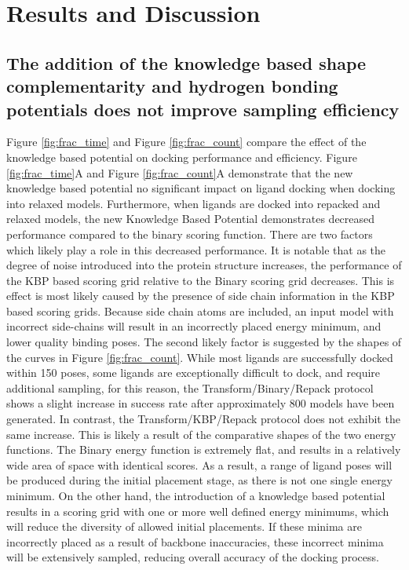 \section{Results and Discussion}

\subsection{The addition of the knowledge based shape complementarity and hydrogen bonding potentials does not improve sampling efficiency}

Figure \ref{fig:frac_time} and Figure \ref{fig:frac_count} compare the effect of the knowledge based potential on docking performance and efficiency.
Figure \ref{fig:frac_time}A and Figure \ref{fig:frac_count}A demonstrate that the new knowledge based potential no significant impact on ligand docking when docking into relaxed models.
Furthermore, when ligands are docked into repacked and relaxed models, the new Knowledge Based Potential demonstrates decreased performance compared to the binary scoring function. 
There are two factors which likely play a role in this decreased performance.
It is notable that as the degree of noise introduced into the protein structure increases, the performance of the \ac{KBP} based scoring grid relative to the Binary scoring grid decreases.
This is effect is most likely caused by the presence of side chain information in the \ac{KBP} based scoring grids.
Because side chain atoms are included, an input model with incorrect side-chains will result in an incorrectly placed energy minimum, and lower quality binding poses. 
The second likely factor is suggested by the shapes of the curves in Figure \ref{fig:frac_count}.
While most ligands are successfully docked within 150 poses, some ligands are exceptionally difficult to dock, and require additional sampling, for this reason, the Transform/Binary/Repack protocol shows a slight increase in success rate after approximately 800 models have been generated.
In contrast, the Transform/\ac{KBP}/Repack protocol does not exhibit the same increase.
This is likely a result of the comparative shapes of the two energy functions.
The Binary energy function is extremely flat, and results in a relatively wide area of space with identical scores.
As a result, a range of ligand poses will be produced during the initial placement stage, as there is not one single energy minimum.
On the other hand, the introduction of a knowledge based potential results in a scoring grid with one or more well defined energy minimums, which will reduce the diversity of allowed initial placements.
If these minima are incorrectly placed as a result of backbone inaccuracies, these incorrect minima will be extensively sampled, reducing overall accuracy of the docking process. 

